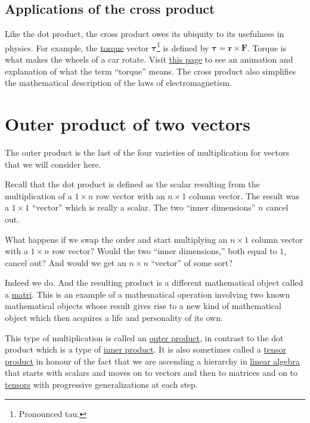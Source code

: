 \documentclass[
  a4paper,
]{article}
\begin{document}
\hypertarget{applications-of-the-cross-product}{%
\subsection{Applications of the cross
product}\label{applications-of-the-cross-product}}

Like the dot product, the cross product owes its ubiquity to its
usefulness in physics. For example, the
\href{https://en.wikipedia.org/wiki/Torque}{torque} vector
\(\symbf{\tau}\)\footnote{Pronounced tau.} is defined by
\(\symbf{\tau} = \mathbf{r}\times\mathbf{F}\). Torque is what makes the
wheels of a car rotate. Visit
\href{https://en.wikipedia.org/wiki/Torque}{this page} to see an
animation and explanation of what the term ``torque'' means. The cross
product also simplifies the mathematical description of the laws of
electromagnetism.

\hypertarget{outer-product-of-two-vectors}{%
\section{Outer product of two
vectors}\label{outer-product-of-two-vectors}}

The outer product is the last of the four varieties of multiplication
for vectors that we will consider here.

Recall that the dot product is defined as the scalar resulting from the
multiplication of a \(1\times n\) row vector with an \(n \times 1\)
column vector. The result was a \(1 \times 1\) ``vector'' which is
really a scalar. The two ``inner dimensions'' \(n\) cancel out.

What happens if we swap the order and start multiplying an
\(n \times 1\) column vector with a \(1\times n\) row vector? Would the
two ``inner dimensions,'' both equal to \(1\), cancel out? And would we
get an \(n \times n\) ``vector'' of some sort?

Indeed we do. And the resulting product is a different mathematical
object called a
\href{https://en.wikipedia.org/wiki/Matrix_\%28mathematics\%29}{matri}.
This is an example of a mathematical operation involving two known
mathematical objects whose result gives rise to a new kind of
mathematical object which then acquires a life and personality of its
own.

This type of multiplication is called an
\href{https://en.wikipedia.org/wiki/Outer_product}{outer product}, in
contrast to the dot product which is a type of
\href{https://planetmath.org/InnerProduct}{inner product}. It is also
sometimes called a
\href{https://en.wikipedia.org/wiki/Tensor_product}{tensor product} in
honour of the fact that we are ascending a hierarchy in
\href{https://en.wikipedia.org/wiki/Linear_algebra}{linear algebra} that
starts with scalars and moves on to vectors and then to matrices and on
to
\href{https://en.wikipedia.org/wiki/Tensor_\%28intrinsic_definition\%29}{tensors}
with progressive generalizations at each step.
\end{document}
